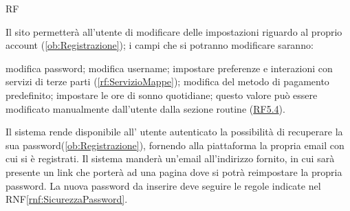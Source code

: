 \begin{listaPersonale}{RF}
\begin{listaPersonale2}{}
	\end{listaPersonale2}

	 Il sito permetterà all'utente di modificare delle impostazioni riguardo al proprio account (\ref{ob:Registrazione}); i campi che si potranno modificare saranno:
	\begin{listaPersonale2}{}
		 modifica password;
		 modifica username;
		 impostare preferenze e interazioni con servizi di terze parti (\ref{rf:ServizioMappe});
		 modifica del metodo di pagamento predefinito;
		 impostare le ore di sonno quotidiane; questo valore può essere modificato manualmente dall'utente dalla sezione routine (\hyperref[rf:RoutineEvento]{RF5.4}).
	\end{listaPersonale2}

	Il sistema rende disponibile all' utente autenticato la possibilità di recuperare la sua password(\ref{ob:Registrazione}), fornendo alla piattaforma la propria email con cui si è registrati. Il sistema manderà un'email all'indirizzo fornito, in cui sarà presente un link che porterà ad una pagina dove si potrà reimpostare la propria password. La nuova password da inserire deve seguire le regole indicate nel RNF\ref{rnf:SicurezzaPassword}. %
\end{listaPersonale}